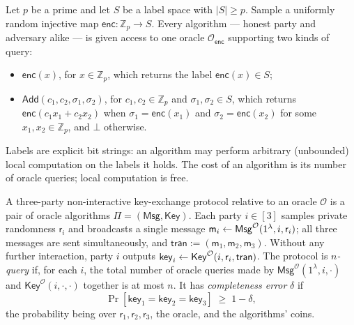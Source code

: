 \documentclass{aicr-conjecture}
\newcommand{\Zp}{\mathbb{Z}_{p}}
\newcommand{\enc}{\mathsf{enc}}
\newcommand{\Add}{\mathsf{Add}}
\newcommand{\Oenc}{\mathcal{O}_{\enc}}
\newcommand{\Msg}{\mathsf{Msg}}
\newcommand{\Key}{\mathsf{Key}}
\newcommand{\tran}{\mathsf{tran}}
\newcommand{\keyv}{\mathsf{key}}
\newcommand{\rv}{\mathsf{r}}
\newcommand{\mv}{\mathsf{m}}
\begin{document}
\begin{definition}\label{def:sggm}
Let $p$ be a prime and let $S$ be a label space with
$\lvert S\rvert \ge p$. Sample a uniformly random injective map
$\enc : \Zp \to S$. Every algorithm --- honest party and adversary
alike --- is given access to one oracle $\Oenc$ supporting two kinds of
query:
\begin{itemize}
  \item $\enc(x)$, for $x \in \Zp$, which returns the label
    $\enc(x) \in S$;
  \item $\Add(c_{1}, c_{2}, \sigma_{1}, \sigma_{2})$, for
    $c_{1}, c_{2} \in \Zp$ and $\sigma_{1}, \sigma_{2} \in S$, which
    returns $\enc(c_{1} x_{1} + c_{2} x_{2})$ when
    $\sigma_{1} = \enc(x_{1})$ and $\sigma_{2} = \enc(x_{2})$ for some
    $x_{1}, x_{2} \in \Zp$, and $\bot$ otherwise.
\end{itemize}
Labels are explicit bit strings: an algorithm may perform arbitrary
(unbounded) local computation on the labels it holds. The cost of an
algorithm is its number of oracle queries; local computation is free.
\end{definition}

\begin{definition}\label{def:nike}
A three-party non-interactive key-exchange protocol relative to an
oracle $\mathcal{O}$ is a pair of oracle algorithms
$\Pi = (\Msg, \Key)$. Each party $i \in [3]$ samples private randomness
$\rv_{i}$ and broadcasts a single message
$\mv_{i} \sample \Msg^{\mathcal{O}}(1^{\lambda}, i, \rv_{i})$; all three
messages are sent simultaneously, and
$\tran := (\mv_{1}, \mv_{2}, \mv_{3})$. Without any further interaction,
party $i$ outputs
$\keyv_{i} \sample \Key^{\mathcal{O}}(i, \rv_{i}, \tran)$. The protocol
is \emph{$n$-query} if, for each $i$, the total number of oracle queries
made by $\Msg^{\mathcal{O}}(1^{\lambda}, i, \cdot)$ and
$\Key^{\mathcal{O}}(i, \cdot, \cdot)$ together is at most $n$. It has
\emph{completeness error} $\delta$ if
\[
  \Pr\!\left[\keyv_{1} = \keyv_{2} = \keyv_{3}\right] \;\ge\; 1 - \delta ,
\]
the probability being over $\rv_{1}, \rv_{2}, \rv_{3}$, the oracle, and
the algorithms' coins.
\end{definition}
\end{document}
